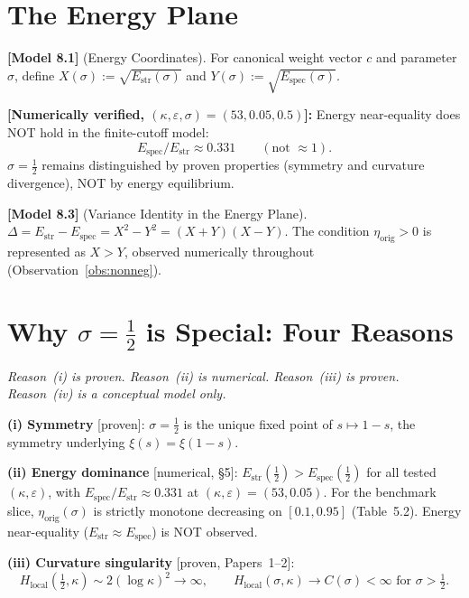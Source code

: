 \documentclass[11pt]{article}
\newcommand{\Estr}{E_{\mathrm{str}}}
\newcommand{\Espec}{E_{\mathrm{spec}}}
\newcommand{\etaorig}{\eta_{\mathrm{orig}}}
\newcommand{\Hlocal}{H_{\mathrm{local}}}
\begin{document}
\section{The Energy Plane}

\textbf{[Model 8.1]} (Energy Coordinates).
For canonical weight vector $c$ and parameter $\sigma$, define
$X(\sigma):=\sqrt{\Estr(\sigma)}$ and $Y(\sigma):=\sqrt{\Espec(\sigma)}$.

\textbf{[Numerically verified, $(\kappa,\varepsilon,\sigma)=(53,0.05,0.5)$]:}
Energy near-equality does NOT hold in the finite-cutoff model:
\[
\Espec/\Estr\approx 0.331\qquad(\text{not }\approx 1).
\]
$\sigma=\tfrac12$ remains distinguished by proven properties (symmetry and
curvature divergence), NOT by energy equilibrium.

\textbf{[Model 8.3]} (Variance Identity in the Energy Plane).
$\Delta=\Estr-\Espec=X^2-Y^2=(X+Y)(X-Y)$.
The condition $\etaorig>0$ is represented as $X>Y$, observed numerically
throughout (Observation~\ref{obs:nonneg}).

\section{Why $\sigma=\tfrac{1}{2}$ is Special: Four Reasons}

\emph{Reason~(i) is proven. Reason~(ii) is numerical. Reason~(iii) is proven.
Reason~(iv) is a conceptual model only.}

\textbf{(i) Symmetry} [proven]:
$\sigma=\tfrac12$ is the unique fixed point of $s\mapsto 1-s$,
the symmetry underlying $\xi(s)=\xi(1-s)$.

\textbf{(ii) Energy dominance} [numerical, \S5]:
$\Estr(\tfrac12)>\Espec(\tfrac12)$ for all tested $(\kappa,\varepsilon)$,
with $\Espec/\Estr\approx 0.331$ at $(\kappa,\varepsilon)=(53,0.05)$.
For the benchmark slice, $\etaorig(\sigma)$ is strictly monotone decreasing
on $[0.1,0.95]$ (Table~5.2). Energy near-equality
($\Estr\approx\Espec$) is NOT observed.

\textbf{(iii) Curvature singularity} [proven, Papers~1--2]:
\[
\Hlocal(\tfrac12,\kappa)\sim 2(\log\kappa)^2\to\infty,\qquad %
\Hlocal(\sigma,\kappa)\to C(\sigma)<\infty\text{ for }\sigma>\tfrac12.
\]
\end{document}
